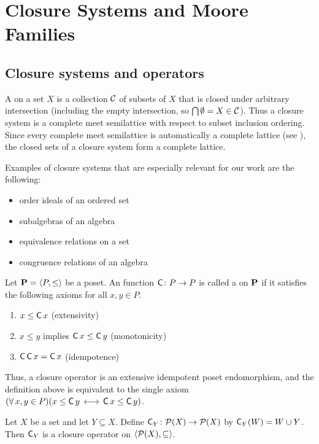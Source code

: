 \section{Closure Systems and Moore Families}
\label{sec:more-gener-appr}

\subsection{Closure systems and operators}
A  on a set $X$ is a collection $\mathcal{C}$
of subsets of $X$ that is closed under arbitrary intersection (including the empty 
intersection, so $\bigcap \emptyset = X \in \mathcal{C}$). 
Thus a closure system is a complete meet semilattice with respect to subset
inclusion ordering. 
Since every complete meet semilattice is automatically a complete lattice
(see \cite[Theorem 2.5]{Nation-notes}), 
the closed sets of a closure system form a complete lattice. 

Examples of closure systems that are especially relevant for our work are the following:
\begin{itemize}
\item order ideals of an ordered set
\item subalgebras of an algebra 
\item equivalence relations on a set
\item congruence relations of an algebra
\end{itemize}

\newcommand{\cl}{\ensuremath{\operatorname{\sansC}}}

Let $\mathbf{P} = \langle P, \leq \rangle$ be a poset.
An function $\cl \colon P \to P$ is called a  on $\mathbf{P}$
if it satisfies the following axioms for all $x, y\in P$.
\begin{enumerate}
\item $x \leq \cl x$ (extensivity) 
\item $x \leq y$ implies $\cl x \leq \cl y$ (monotonicity) 
\item $\cl \cl x = \cl x$ (idempotence) 
\end{enumerate}
Thus, a closure operator is an extensive idempotent poset endomorphism,
and the definition above is equivalent to the single axiom
$(\forall\, x, y \in P) (x \leq \cl y \, \longleftrightarrow  \, \cl x \leq  \cl y)$.

\begin{example}
Let $X$ be a set and let $Y \subseteq X$.
Define $\cl_Y\colon \sP(X) \to \sP(X)$ by $\cl_Y (W) = W \cup Y$.
Then $\cl_Y$ is a closure operator on $\langle\mathcal{P}(X), \subseteq\rangle$.
\end{example}


